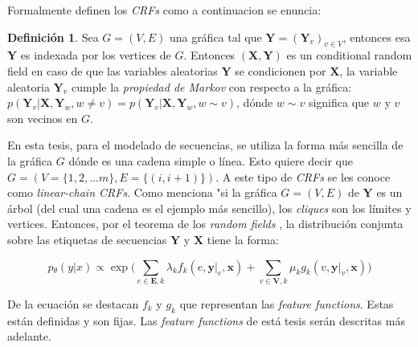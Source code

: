\documentclass[letterpaper,12pt,oneside]{book}
\theoremstyle{definition}
\newtheorem{definition}{Definición}
\begin{document}
	
	Formalmente \citet{lafferty2001conditional} definen los \textit{CRFs} como a continuacion se enuncia:

	
	\begin{definition}

		Sea $G = (V,E)$ una gráfica tal que $\mathbf{Y} = (\mathbf{Y}_{v})_{v \in V}$, entonces esa $\mathbf{Y}$ es indexada por los vertices de $G$. Entonces $(\mathbf{X}, \mathbf{Y})$ es un \textsf{conditional random field} en caso de que las variables aleatorias $\mathbf{Y}$ se condicionen por $\mathbf{X}$, la variable aleatoria $\mathbf{Y}_{v}$ cumple la \textit{propiedad de Markov} con respecto a la gráfica: $p(\mathbf{Y}_{v}|\mathbf{X},\mathbf{Y}_{w},w \ne v) = p(\mathbf{Y}_{v}|\mathbf{X},\mathbf{Y}_{w},w \sim v)$, dónde $w \sim v$ significa que $w$ y $v$ son vecinos en $G$.

	\end{definition}

	
	En esta tesis, para el modelado de secuencias, se utiliza la forma más sencilla de la gráfica $G$ dónde es una cadena simple o línea. Esto quiere decir que $G = (V = \{1,2,...m\}, E = \{(i,i+1)\})$. A este tipo de \textit{CRFs} se les conoce como \textit{linear-chain CRFs}. Como menciona \citet{lafferty2001conditional} "si la gráfica $G = (V,E)$ de $\mathbf{Y}$ es un árbol (del cual una cadena es el ejemplo más sencillo), los \textit{cliques} son los límites y vertices. Entonces, por el teorema de los \textit{random fields} \citep{hammersley1971markov}, la distribución conjunta sobre las etiquetas de secuencias $\mathbf{Y}$ y $\mathbf{X}$ tiene la forma:

	


	\begin{equation}

		p{_{\theta}}(y|x) \propto \exp \bigg( \sum\limits_{e \in \mathbf{E},k} \lambda_{k}f_{k}(e,\mathbf{y}|_{e},\mathbf{x}) + \sum\limits_{v \in \mathbf{V},k}\mu_{k}g_{k}(v,\mathbf{y}|_{v},\mathbf{x}) \bigg)

	\end{equation}

	


	
	De la ecuación  se destacan $f_{k}$ y $g_{k}$ que representan las \textit{feature functions}. Estas están definidas y son fijas. Las \textit{feature functions} de está tesis serán descritas más adelante. 
\end{document}
